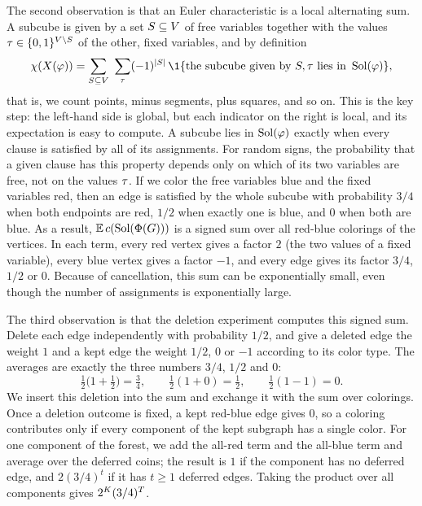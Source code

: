 The second observation is that an Euler characteristic is a local alternating
sum. A subcube is given by a set \(S\subseteq V\) of free variables
together with the values \(\tau\in\{0,1\}^{V\setminus S}\) of the
other, fixed variables, and by definition
\[
  \euler{\cplx{\fml}}=\sum_{\freeset\subseteq \Vset}\ \sum_{\fixasg}
  (-1)^{|\freeset|}\,\1\{\text{the subcube given by }\freeset,\fixasg\text{ lies in }\Sol(\fml)\},
\]
that is, we count points, minus segments, plus squares, and so on. This is the
key step: the left-hand side is global, but each indicator on the right is
local, and its expectation is easy to compute. A subcube lies in \(\operatorname{Sol}(\varphi)\)
exactly when every clause is satisfied by all of its assignments. For random
signs, the probability that a given clause has this property depends only on
which of its two variables are free, not on the values \(\tau\). If we
color the free variables blue and the fixed variables red, then an edge is
satisfied by the whole subcube with probability \(3/4\) when both endpoints are
red, \(1/2\) when exactly one is blue, and \(0\) when both are blue. As a
result, \(\mathbb{E}\,c(\operatorname{Sol}(\Phi(G)))\) is a signed sum over all red-blue
colorings of the vertices. In each term, every red vertex gives a factor \(2\)
(the two values of a fixed variable), every blue vertex gives a factor \(-1\),
and every edge gives its factor \(3/4\), \(1/2\) or \(0\). Because of cancellation,
this sum can be exponentially small, even though the number of assignments is
exponentially large.

The third observation is that the deletion experiment computes this signed sum.
Delete each edge independently with probability \(1/2\), and give a deleted
edge the weight \(1\) and a kept edge the weight \(1/2\), \(0\) or \(-1\)
according to its color type. The averages are exactly the three numbers
\(3/4\), \(1/2\) and \(0\):
\[
  \tfrac12\bigl(1+\tfrac12\bigr)=\tfrac34,\qquad
  \tfrac12(1+0)=\tfrac12,\qquad
  \tfrac12(1-1)=0 .
\]
We insert this deletion into the sum and exchange it with the sum over
colorings. Once a deletion outcome is fixed, a kept red-blue edge gives \(0\),
so a coloring contributes only if every component of the kept subgraph has a
single color. For one component of the forest, we add the all-red term and the
all-blue term and average over the deferred coins; the result is \(1\) if the
component has no deferred edge, and \(2(3/4)^{t}\) if it has \(t\ge1\) deferred
edges. Taking the product over all components gives
\(2^{K}(3/4)^{T}\).

